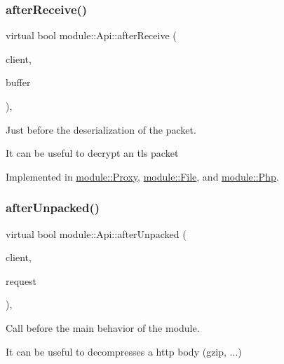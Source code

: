 \subsubsection{\texorpdfstring{after\+Receive()}{afterReceive()}}
{\footnotesize\ttfamily virtual bool module\+::\+Api\+::after\+Receive (\begin{DoxyParamCaption}\item[{const \hyperlink{structnet_1_1IClient}{net\+::\+I\+Client} \&}]{client,  }\item[{std\+::string \&}]{buffer }\end{DoxyParamCaption})\hspace{0.3cm}{\ttfamily [pure virtual]}, {\ttfamily [noexcept]}}



Just before the deserialization of the packet. 

It can be useful to decrypt an tls packet 

Implemented in \hyperlink{classmodule_1_1Proxy_a0dbbd27ea29602830d770c5c550b1ee4}{module\+::\+Proxy}, \hyperlink{classmodule_1_1File_af37dc06c40ef291f3789ae4b00e628d7}{module\+::\+File}, and \hyperlink{classmodule_1_1Php_a553dd60d283baf309a9ba8ddb87681b8}{module\+::\+Php}.

\mbox{\label{structmodule_1_1Api_a291297e6d233e69b82c976e085f7c237}} 
\subsubsection{\texorpdfstring{after\+Unpacked()}{afterUnpacked()}}
{\footnotesize\ttfamily virtual bool module\+::\+Api\+::after\+Unpacked (\begin{DoxyParamCaption}\item[{const \hyperlink{structnet_1_1IClient}{net\+::\+I\+Client} \&}]{client,  }\item[{\hyperlink{structhttp_1_1IRequest}{http\+::\+I\+Request} \&}]{request }\end{DoxyParamCaption})\hspace{0.3cm}{\ttfamily [pure virtual]}, {\ttfamily [noexcept]}}



Call before the main behavior of the module. 

It can be useful to decompresses a http body (gzip, ...) 

